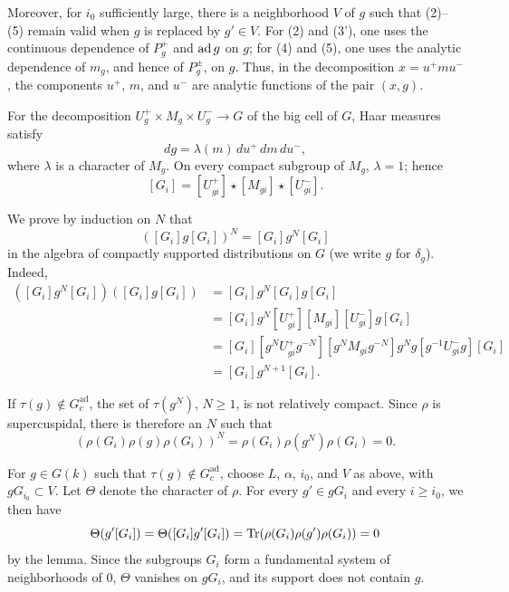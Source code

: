 Moreover, for \(i_0\) sufficiently large, there is a neighborhood \(V\) of
\(g\) such that (2)--(5) remain valid when \(g\) is replaced by \(g'\in V\).
For (2) and (3'), one uses the continuous dependence of \(P_g^{+}\) and
\(\operatorname{ad} g\) on \(g\); for (4) and (5), one uses the analytic dependence of
\(m_g\), and hence of \(P_g^{\pm}\), on \(g\). Thus, in the decomposition
\(x=u^{+}mu^{-}\), the components \(u^{+}\), \(m\), and \(u^{-}\) are analytic
functions of the pair \((x,g)\).


For the decomposition \(U_g^{+}\times M_g\times U_g^{-}\to G\) of the big
cell of \(G\), Haar measures satisfy
\[
  dg=\lambda(m)\,du^{+}\,dm\,du^{-},
\]
where \(\lambda\) is a character of \(M_g\). On every compact subgroup of
\(M_g\), \(\lambda=1\); hence
\[
  [G_i]=[U_{gi}^{+}]\star[M_{gi}]\star[U_{gi}^{-}].
\]

We prove by induction on \(N\) that
\[
  ([G_i]g[G_i])^{N}=[G_i]g^{N}[G_i]
\]
in the algebra of compactly supported distributions on \(G\) (we write \(g\)
for \(\delta_g\)). Indeed,
\begin{align*}
([G_i]g^{N}[G_i])([G_i]g[G_i])
  &=[G_i]g^{N}[G_i]g[G_i]\\
  &=[G_i]g^{N}[U_{gi}^{+}][M_{gi}][U_{gi}^{-}]g[G_i]\\
  &=[G_i][g^{N}U_{gi}^{+}g^{-N}]
    [g^{N}M_{gi}g^{-N}]g^{N}g
    [g^{-1}U_{gi}^{-}g][G_i]\\
  &=[G_i]g^{N+1}[G_i].
\end{align*}

If \(\tau(g)\notin G_c^{\mathrm{ad}}\), the set of \(\tau(g^{N})\),
\(N\geq1\), is not relatively compact. Since \(\rho\) is supercuspidal, there
is therefore an \(N\) such that
\[
  (\rho(G_i)\rho(g)\rho(G_i))^{N}
  =\rho(G_i)\rho(g^{N})\rho(G_i)=0.
\]

For \(g\in G(k)\) such that \(\tau(g)\notin G_c^{\mathrm{ad}}\), choose \(L\),
\(\alpha\), \(i_0\), and \(V\) as above, with \(gG_{i_0}\subset V\). Let
\(\Theta\) denote the character of \(\rho\). For every \(g'\in gG_i\) and
every \(i\geq i_0\), we then have
\[
  \Theta(g'[G_i])=\Theta([G_i]g'[G_i])
  =\operatorname{Tr}(\rho(G_i)\rho(g')\rho(G_i))=0
\]
by the lemma. Since the subgroups \(G_i\) form a fundamental system of
neighborhoods of \(0\), \(\Theta\) vanishes on \(gG_i\), and its support does
not contain \(g\).

